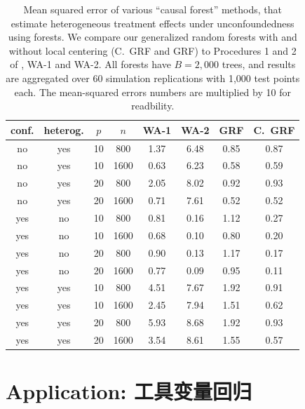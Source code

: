 \documentclass[aos]{imsart}
\theoremstyle{plain}
\theoremstyle{definition}
\theoremstyle{remark}
\begin{document}
\begin{CJK}{UTF8}{gbsn}
\begin{table}[t]
\centering
\begin{tabular}{||cc|cc||cc|cc||}
\hline
conf. & heterog. & $p$ & $n$ & WA-1 & WA-2 & GRF & C.~GRF \\
  \hline
\hline
no & yes & 10 & 800 & 1.37 & 6.48 & 0.85 & 0.87 \\
  no & yes & 10 & 1600 & 0.63 & 6.23 & 0.58 & 0.59 \\
  no & yes & 20 & 800 & 2.05 & 8.02 & 0.92 & 0.93 \\
  no & yes & 20 & 1600 & 0.71 & 7.61 & 0.52 & 0.52 \\
   \hline
yes & no & 10 & 800 & 0.81 & 0.16 & 1.12 & 0.27 \\
  yes & no & 10 & 1600 & 0.68 & 0.10 & 0.80 & 0.20 \\
  yes & no & 20 & 800 & 0.90 & 0.13 & 1.17 & 0.17 \\
  yes & no & 20 & 1600 & 0.77 & 0.09 & 0.95 & 0.11 \\
   \hline
yes & yes & 10 & 800 & 4.51 & 7.67 & 1.92 & 0.91 \\
  yes & yes & 10 & 1600 & 2.45 & 7.94 & 1.51 & 0.62 \\
  yes & yes & 20 & 800 & 5.93 & 8.68 & 1.92 & 0.93 \\
  yes & yes & 20 & 1600 & 3.54 & 8.61 & 1.55 & 0.57 \\
   \hline
\end{tabular}
\caption{Mean squared error of various ``causal forest'' methods, that
estimate heterogeneous treatment effects under unconfoundedness using forests.
We compare our generalized random forests with and without local centering (C.~GRF and GRF)
to Procedures 1 and 2 of \citet{wager2015estimation}, WA-1 and WA-2.
All forests have $B=2,000$ trees, and results are aggregated over 60 simulation replications
with 1,000 test points each. The mean-squared errors numbers are multiplied by 10 for readbility.}
\label{tab:cf_simu}
\vspace{-1.5\baselineskip}
\end{table}


\section{Application: 工具变量回归}
\label{sec:iv}


\end{CJK}
\end{document}
